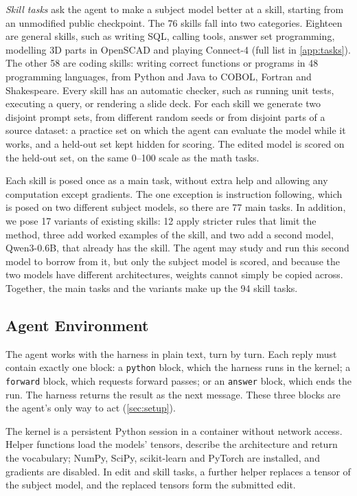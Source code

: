 \documentclass[11pt]{article}
\begin{document}
\emph{Skill tasks} ask the agent to make a subject model better at a skill, starting from an unmodified
public checkpoint. The 76 skills fall into two categories. Eighteen are general skills, such as
writing SQL, calling tools, answer set programming, modelling 3D parts in OpenSCAD and playing
Connect-4 (full list in \cref{app:tasks}). The other 58 are coding skills: writing correct
functions or programs in 48 programming languages, from Python and Java to COBOL, Fortran and
Shakespeare. Every skill has an automatic checker, such as running unit tests, executing a query,
or rendering a slide deck. For each skill we generate two disjoint prompt sets, from different
random seeds or from disjoint parts of a source dataset: a practice set on which the agent can
evaluate the model while it works, and a held-out set kept hidden for scoring. The edited model is
scored on the held-out set, on the same 0--100 scale as the math tasks.

Each skill is posed once as a main task, without extra help and allowing any computation except
gradients. The one exception is instruction following, which is posed on two different subject
models, so there are 77 main tasks. In addition, we pose 17 variants of existing skills: 12
apply stricter rules that limit the method, three add worked examples of the skill, and two add a second model,
Qwen3-0.6B, that already has the skill. The agent may study and run this second model to borrow
from it, but only the subject model is scored, and because the two models have different
architectures, weights cannot simply be copied across. Together, the main tasks and the variants
make up the 94 skill tasks.

\subsection{Agent Environment}\label{sec:environment}

The agent works with the harness in plain text, turn by turn. Each reply must contain exactly
one block: a \texttt{python} block, which the harness runs in the kernel; a \texttt{forward}
block, which requests forward passes; or an \texttt{answer} block, which ends the run. The harness
returns the result as the next message. These three blocks are the agent's only way to act
(\cref{sec:setup}).

The kernel is a persistent Python session in a container without network access. Helper
functions load the models' tensors, describe the architecture and return the vocabulary; NumPy,
SciPy, scikit-learn and PyTorch are installed, and gradients are disabled. In edit and skill
tasks, a further helper replaces a tensor of the subject model, and the replaced tensors form the
submitted edit.
\end{document}
